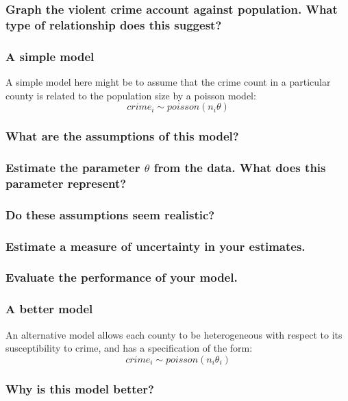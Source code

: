 \documentclass[11pt,fullpage]{book}
\begin{document}
\subsubsection{Graph the violent crime account against population. What type of relationship does this suggest?}
\subsubsection{A simple model}
A simple model here might be to assume that the crime count in a particular county is related to the population size by a poisson model:
\begin{equation}
crime_i \sim poisson(n_i\theta)
\end{equation}
\subsubsection{What are the assumptions of this model?}
\subsubsection{Estimate the parameter $\theta$ from the data. What does this parameter represent?}
\subsubsection{Do these assumptions seem realistic?}
\subsubsection{Estimate a measure of uncertainty in your estimates.}
\subsubsection{Evaluate the performance of your model.}

\subsubsection{A better model}
An alternative model allows each county to be heterogeneous with respect to its susceptibility to crime, and has a specification of the form:
\begin{equation}
crime_i \sim poisson(n_i\theta_i)
\end{equation}
\subsubsection{Why is this model better?}
\end{document}
